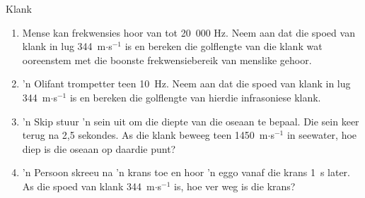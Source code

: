 \begin{eocexercises}{Klank}
\begin{enumerate}[noitemsep, label=\textbf{\arabic*}. ]
\item Mense kan frekwensies hoor van tot 20~000 Hz. Neem aan dat die spoed van klank in lug 344~m$\ensuremath{\cdot}$s${}^{-1}$ is en bereken die golflengte van die klank wat ooreenstem met die boonste frekwensiebereik van menslike gehoor.

\item 'n Olifant trompetter teen 10~Hz. Neem aan dat die spoed van klank in lug 344~m$\ensuremath{\cdot}$s${}^{-1}$ is en bereken die golflengte van hierdie infrasoniese klank.

\item 'n Skip stuur 'n sein uit om die diepte van die oseaan te bepaal. Die sein keer terug na 2,5 sekondes. As die klank beweeg teen 1450~m$\ensuremath{\cdot}$s${}^{-1}$ in seewater, hoe diep is die oseaan op daardie punt?

\item 'n Persoon skreeu na 'n krans toe en hoor 'n eggo vanaf die krans 1~s later. As die spoed van klank 344~m$\ensuremath{\cdot}$s${}^{-1}$ is, hoe ver weg is die krans?


\end{enumerate}
\end{eocexercises}
